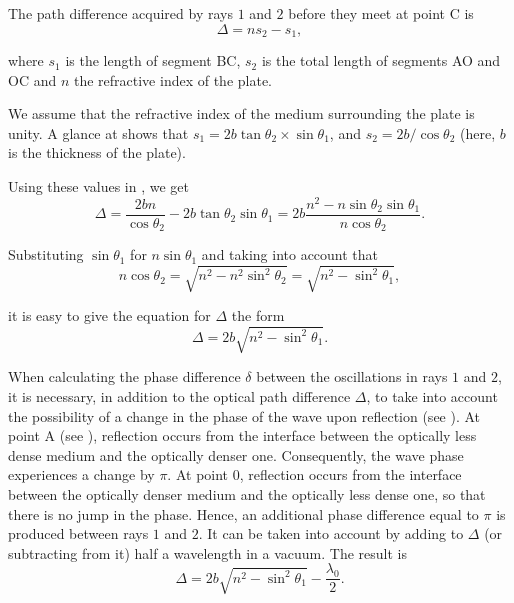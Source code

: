 The path difference acquired by rays $1$ and $2$ before they meet at point C is
\begin{equation}\label{eq:17_32}
    \Delta = ns_2 - s_1,
\end{equation}

\noindent
where $s_1$ is the length of segment BC, $s_2$ is the total length of segments AO and OC and $n$ the refractive index of the plate.

We assume that the refractive index of the medium surrounding the plate is unity.
A glance at  shows that $s_1 = 2b \tan\theta_2 \times \sin\theta_1$, and $s_2=2b/\cos\theta_2$ (here, $b$ is the thickness of the plate).

Using these values in , we get
\begin{equation*}
    \Delta = \frac{2bn}{\cos\theta_2} - 2b\tan\theta_2\sin\theta_1 = 2b \frac{n^2 - n \sin\theta_2 \sin\theta_1}{n \cos\theta_2}.
\end{equation*}

\noindent
Substituting $\sin\theta_1$ for $n\sin\theta_1$ and taking into account that
\begin{equation*}
    n \cos\theta_2 = \sqrt{n^2 - n^2 \sin^2\theta_2} = \sqrt{n^2 - \sin^2\theta_1},
\end{equation*}

\noindent
it is easy to give the equation for $\Delta$ the form
\begin{equation}\label{eq:17_33}
    \Delta = 2b \sqrt{n^2 - \sin^2\theta_1}.
\end{equation}

When calculating the phase difference $\delta$ between the oscillations in rays $1$ and $2$, it is necessary, in addition to the optical path difference $\Delta$, to take into account the possibility of a change in the phase of the wave upon reflection (see ).
At point A (see ), reflection occurs from the interface between the optically less dense medium and the optically denser one.
Consequently, the wave phase experiences a change by $\pi$.
At point $0$, reflection occurs from the interface between the optically denser medium and the optically less dense one, so that there is no jump in the phase.
Hence, an additional phase difference equal to $\pi$ is produced between rays $1$ and $2$.
It can be taken into account by adding to $\Delta$ (or subtracting from it) half a wavelength in a vacuum. The result is
\begin{equation}\label{eq:17_34}
    \Delta = 2 b \sqrt{n^2 - \sin^2\theta_1} - \frac{\lambda_0}{2}.
\end{equation}

